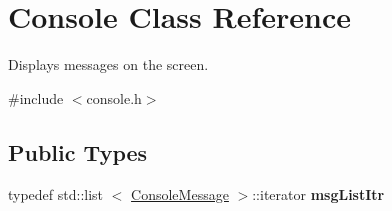 \hypertarget{classConsole}{
\section{\-Console \-Class \-Reference}
\label{d2/d24/classConsole}
}


\-Displays messages on the screen.  




{\ttfamily \#include $<$console.\-h$>$}

\subsection*{\-Public \-Types}
\begin{DoxyCompactItemize}
\item 
\hypertarget{classConsole_adef0801921bfd9023d168f30f8086016}{
typedef std\-::list\*
$<$ \hyperlink{structConsoleMessage}{\-Console\-Message} $>$\-::iterator {\bfseries msg\-List\-Itr}}
\label{d2/d24/classConsole_adef0801921bfd9023d168f30f8086016}

\end{DoxyCompactItemize}

